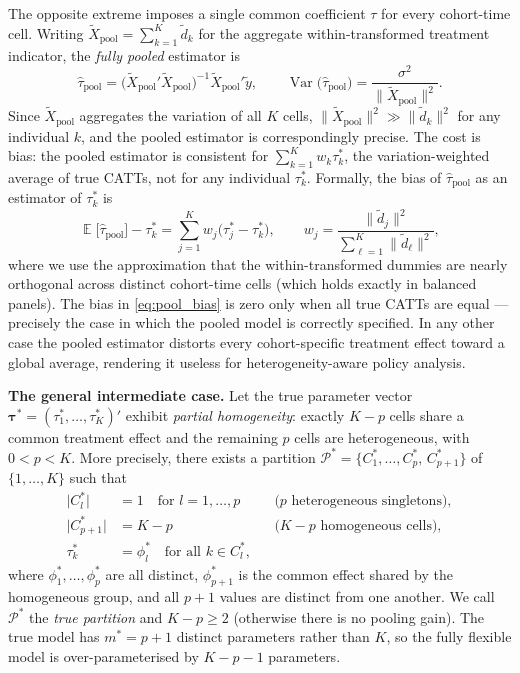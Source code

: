 \documentclass[12pt]{article}
\DeclareMathOperator{\E}{\mathbb{E}}
\DeclareMathOperator{\Var}{Var}
\newcommand{\1}{\mathbbm{1}}
\newcommand{\ytd}{\tilde{y}}
\begin{document}
The opposite extreme imposes a single common coefficient $\tau$ for every
cohort-time cell.
Writing $\tilde{X}_{\text{pool}} = \sum_{k=1}^K \tilde{d}_k$ for the
aggregate within-transformed treatment indicator, the \emph{fully pooled}
estimator is
\begin{equation}
  \hat\tau_{\text{pool}}
  = \bigl(\tilde{X}_{\text{pool}}'\tilde{X}_{\text{pool}}\bigr)^{-1}
    \tilde{X}_{\text{pool}}'\ytd,
  \qquad
  \Var\!\bigl(\hat\tau_{\text{pool}}\bigr)
  = \frac{\sigma^2}{\bigl\|\tilde{X}_{\text{pool}}\bigr\|^2}.
  \label{eq:pool_var}
\end{equation}
Since $\tilde{X}_{\text{pool}}$ aggregates the variation of all $K$ cells,
$\|\tilde{X}_{\text{pool}}\|^2 \gg \|\tilde{d}_k\|^2$ for any individual
$k$, and the pooled estimator is correspondingly precise.
The cost is bias: the pooled estimator is consistent for
$\sum_{k=1}^K w_k \tau_k^*$, the variation-weighted average of true CATTs,
not for any individual $\tau_k^*$.
Formally, the bias of $\hat\tau_{\text{pool}}$ as an estimator of $\tau_k^*$ is
\begin{equation}
  \E\bigl[\hat\tau_{\text{pool}}\bigr] - \tau_k^*
  = \sum_{j=1}^K w_j\bigl(\tau_j^* - \tau_k^*\bigr),
  \qquad
  w_j = \frac{\|\tilde{d}_j\|^2}{\sum_{\ell=1}^K \|\tilde{d}_\ell\|^2},
  \label{eq:pool_bias}
\end{equation}
where we use the approximation that the within-transformed dummies are
nearly orthogonal across distinct cohort-time cells (which holds exactly in
balanced panels).
The bias in \eqref{eq:pool_bias} is zero only when all true CATTs are equal
--- precisely the case in which the pooled model is correctly specified.
In any other case the pooled estimator distorts every cohort-specific
treatment effect toward a global average, rendering it useless for
heterogeneity-aware policy analysis.

\bigskip

\noindent\textbf{The general intermediate case.}
Let the true parameter vector $\bm{\tau}^* = (\tau_1^*,\ldots,\tau_K^*)'$
exhibit \emph{partial homogeneity}: exactly $K-p$ cells share a common
treatment effect and the remaining $p$ cells are heterogeneous, with
$0 < p < K$.
More precisely, there exists a partition $\mathcal{P}^* =
\{C_1^*,\ldots,C_p^*,\, C_{p+1}^*\}$ of $\{1,\ldots,K\}$ such that
\begin{align}
  \bigl|C_l^*\bigr| &= 1 \quad \text{for } l = 1,\ldots,p
    && \text{($p$ heterogeneous singletons)},
  \label{eq:singletons}\\
  \bigl|C_{p+1}^*\bigr| &= K - p
    && \text{($K-p$ homogeneous cells)},
  \label{eq:homo_group}\\
  \tau_k^* &= \phi_l^* \quad \text{for all } k \in C_l^*,
  \label{eq:true_effects}
\end{align}
where $\phi_1^*, \ldots, \phi_p^*$ are all distinct, $\phi_{p+1}^*$ is the
common effect shared by the homogeneous group, and all $p+1$ values are
distinct from one another.
We call $\mathcal{P}^*$ the \emph{true partition} and $K - p \geq 2$
(otherwise there is no pooling gain).
The true model has $m^* = p + 1$ distinct parameters rather than $K$,
so the fully flexible model is over-parameterised by $K - p - 1$ parameters.
\end{document}
